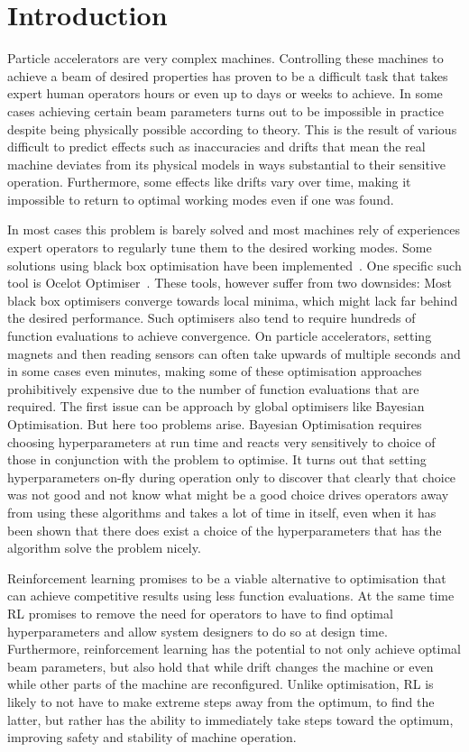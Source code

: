 \section{Introduction}

Particle accelerators are very complex machines. Controlling these machines to achieve a beam of desired properties has proven to be a difficult task that takes expert human operators hours or even up to days or weeks to achieve. In some cases achieving certain beam parameters turns out to be impossible in practice despite being physically possible according to theory. This is the result of various difficult to predict effects such as inaccuracies and drifts that mean the real machine deviates from its physical models in ways substantial to their sensitive operation. Furthermore, some effects like drifts vary over time, making it impossible to return to optimal working modes even if one was found.

In most cases this problem is barely solved and most machines rely of experiences expert operators to regularly tune them to the desired working modes. Some solutions using black box optimisation have been implemented~\cite{TODO}. One specific such tool is Ocelot Optimiser~\cite{TODO}. These tools, however suffer from two downsides: Most black box optimisers converge towards local minima, which might lack far behind the desired performance. Such optimisers also tend to require hundreds of function evaluations to achieve convergence. On particle accelerators, setting magnets and then reading sensors can often take upwards of multiple seconds and in some cases even minutes, making some of these optimisation approaches prohibitively expensive due to the number of function evaluations that are required. The first issue can be approach by global optimisers like Bayesian Optimisation. But here too problems arise. Bayesian Optimisation requires choosing hyperparameters at run time and reacts very sensitively to choice of those in conjunction with the problem to optimise. It turns out that setting hyperparameters on-fly during operation only to discover that clearly that choice was not good and not know what might be a good choice drives operators away from using these algorithms and takes a lot of time in itself, even when it has been shown that there does exist a choice of the hyperparameters that has the algorithm solve the problem nicely.

Reinforcement learning promises to be a viable alternative to optimisation that can achieve competitive results using less function evaluations. At the same time \ac{RL} promises to remove the need for operators to have to find optimal hyperparameters and allow system designers to do so at design time. Furthermore, reinforcement learning has the potential to not only achieve optimal beam parameters, but also hold that while drift changes the machine or even while other parts of the machine are reconfigured. Unlike optimisation, \ac{RL} is likely to not have to make extreme steps away from the optimum, to find the latter, but rather has the ability to immediately take steps toward the optimum, improving safety and stability of machine operation.


